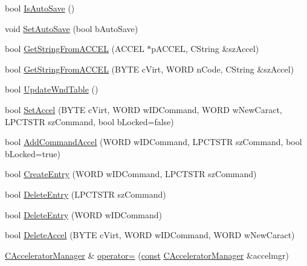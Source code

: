 \begin{DoxyCompactItemize}
\item 
bool \mbox{\hyperlink{class_c_accelerator_manager_a895420283e3ce58576ded1a3f999724a}{Is\+Auto\+Save}} ()
\item 
void \mbox{\hyperlink{class_c_accelerator_manager_a84b4a9dfb4afc48430655e234ff94349}{Set\+Auto\+Save}} (bool b\+Auto\+Save)
\item 
bool \mbox{\hyperlink{class_c_accelerator_manager_a5e861b03f3647e8c4998c49ccd4d8928}{Get\+String\+From\+A\+C\+C\+EL}} (A\+C\+C\+EL $\ast$p\+A\+C\+C\+EL, C\+String \&sz\+Accel)
\item 
bool \mbox{\hyperlink{class_c_accelerator_manager_adf91477de6b9df320930786c9755b0eb}{Get\+String\+From\+A\+C\+C\+EL}} (B\+Y\+TE c\+Virt, W\+O\+RD n\+Code, C\+String \&sz\+Accel)
\item 
bool \mbox{\hyperlink{class_c_accelerator_manager_a3fa9c8e4f44acc76cc40fc7382e597d8}{Update\+Wnd\+Table}} ()
\item 
bool \mbox{\hyperlink{class_c_accelerator_manager_a96957fd8ed0a15d0dbc508359824db3c}{Set\+Accel}} (B\+Y\+TE c\+Virt, W\+O\+RD w\+I\+D\+Command, W\+O\+RD w\+New\+Caract, L\+P\+C\+T\+S\+TR sz\+Command, bool b\+Locked=false)
\item 
bool \mbox{\hyperlink{class_c_accelerator_manager_a05227e733c2c5d4a4d8074bf28a4f333}{Add\+Command\+Accel}} (W\+O\+RD w\+I\+D\+Command, L\+P\+C\+T\+S\+TR sz\+Command, bool b\+Locked=true)
\item 
bool \mbox{\hyperlink{class_c_accelerator_manager_ab534c2d8c0d7d7e30c5e907677bfad68}{Create\+Entry}} (W\+O\+RD w\+I\+D\+Command, L\+P\+C\+T\+S\+TR sz\+Command)
\item 
bool \mbox{\hyperlink{class_c_accelerator_manager_ae20cd0e0259b70fe7443b442e85d1213}{Delete\+Entry}} (L\+P\+C\+T\+S\+TR sz\+Command)
\item 
bool \mbox{\hyperlink{class_c_accelerator_manager_a25f2470050bd966a2f45235381dda32b}{Delete\+Entry}} (W\+O\+RD w\+I\+D\+Command)
\item 
bool \mbox{\hyperlink{class_c_accelerator_manager_a73426e98a7fb4d8e5481a8e55a8a2626}{Delete\+Accel}} (B\+Y\+TE c\+Virt, W\+O\+RD w\+I\+D\+Command, W\+O\+RD w\+New\+Caract)
\item 
\mbox{\hyperlink{class_c_accelerator_manager}{C\+Accelerator\+Manager}} \& \mbox{\hyperlink{class_c_accelerator_manager_a11c56cbcdfac0008ecb4aef10ba51ae8}{operator=}} (\mbox{\hyperlink{getopt1_8c_a2c212835823e3c54a8ab6d95c652660e}{const}} \mbox{\hyperlink{class_c_accelerator_manager}{C\+Accelerator\+Manager}} \&accelmgr)
\end{DoxyCompactItemize}
